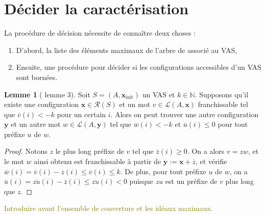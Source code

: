 \documentclass[a4paper,final]{article}
\theoremstyle{definition}
\newtheorem{Lemma}[Theorem]{Lemme}
\let\leq\leqslant
\let\geq\geqslant
\newcommand{\lucas}[1]{\textcolor{olive}{#1}}
\newcommand{\os}[1]{\left\{\mathinner{#1}\right\}}
\newcommand{\N}{\ensuremath{\mathbb{N}}}
\newcommand{\lang}{\ensuremath{\mathcal{L}}}
\newcommand{\conf}{\ensuremath{\mathcal{R}}}
\newcommand{\vect}[1]{\ensuremath{\mathbf{#1}}}
\newcommand{\xinit}{\ensuremath{\vect{x}_\text{init}}}
\newcommand{\valeur}[1]{\ensuremath{\overline{#1}}}
\begin{document}


\section{Décider la caractérisation}

La procédure de décision nécessite de connaître deux choses :
\begin{enumerate}
    \item D'abord, la liste des éléments maximaux de l'arbre de  associé au VAS,
    \item Ensuite, une procédure pour décider si les configurations accessibles d'un VAS sont bornées.
\end{enumerate}

\begin{Lemma}[\cite{giyo80} lemme 3]\label{mot décroissant}
    Soit $S=(A,\xinit)$ un VAS et $k\in\N$.
    Supposons qu'il existe une configuration $\vect{x}\in \conf(S)$ et un mot $v\in\lang(A,\vect{x})$ franchissable tel que $\valeur{v}(i) < -k$ pour un certain $i$.
    Alors on peut trouver une autre configuration $\vect{y}$ et un autre mot $w\in\lang(A,\vect{y})$ tel que $\valeur{w}(i) < -k$ et $\valeur{u}(i) \leq 0$ pour tout préfixe $u$ de $w$.
\end{Lemma}

\begin{proof}
Notons $z$ le plus long préfixe de $v$ tel que $\valeur{z}(i) \geq 0$.
On a alors $v = zw$, et le mot $w$ ainsi obtenu est franchissable à partir de $\vect{y} := \vect{x} + \valeur{z}$, 
et vérifie $\valeur{w}(i) = \valeur{v}(i) - \valeur{z}(i) \leq \valeur{v}(i) \leq k$.
De plus, pour tout préfixe $u$ de $w$, on a $\valeur{u}(i) = \valeur{zu}(i) - \valeur{z}(i) \leq \valeur{zu}(i) < 0$ puisque $zu$ est un préfixe de $v$ plus long que $z$.
\end{proof}

\lucas{Introduire avant l'ensemble de couverture et les idéaux maximaux.}
\end{document}
